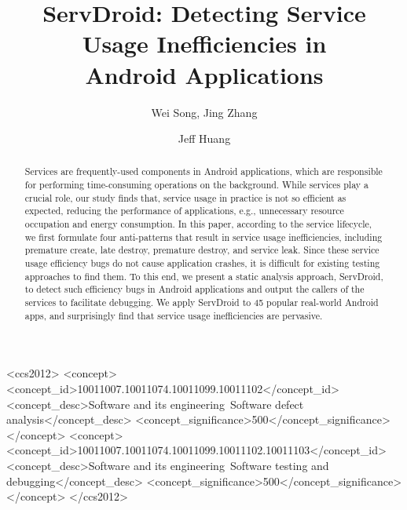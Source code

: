 \documentclass[sigconf,review, anonymous]{acmart}
\begin{document}
\title{ServDroid: Detecting Service Usage Inefficiencies in\\  Android Applications}

\author{Wei Song, Jing Zhang}

\author{Jeff Huang}

\renewcommand{\shortauthors}{}


\begin{abstract}
Services are frequently-used components in Android applications, which are responsible for performing time-consuming operations on the background. While services play a crucial role, our study finds that, service usage in practice is not so efficient as expected, reducing the performance of applications, e.g., unnecessary resource occupation and energy consumption. In this paper, according to the service lifecycle, we first formulate four anti-patterns that result in service usage inefficiencies, including premature create, late destroy, premature destroy, and service leak. Since these service usage efficiency bugs do not cause application crashes, it is difficult for existing testing approaches to find them. To this end, we present a static analysis approach, \textsf{ServDroid}, to detect such efficiency bugs in Android applications and output the callers of the services to facilitate debugging. We apply \textsf{ServDroid} to 45 popular real-world Android apps, and surprisingly find that service usage inefficiencies are pervasive.
\end{abstract}

%
%
\begin{CCSXML}
<ccs2012>
<concept>
<concept_id>10011007.10011074.10011099.10011102</concept_id>
<concept_desc>Software and its engineering~Software defect analysis</concept_desc>
<concept_significance>500</concept_significance>
</concept>
<concept>
<concept_id>10011007.10011074.10011099.10011102.10011103</concept_id>
<concept_desc>Software and its engineering~Software testing and debugging</concept_desc>
<concept_significance>500</concept_significance>
</concept>
</ccs2012>
\end{CCSXML}
\end{document}
